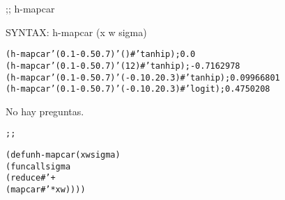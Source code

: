 \begin{aibox}{\function}
;; h-mapcar

SYNTAX: h-mapcar (x w sigma) 
\end{aibox}

\begin{aibox}{\examples}
\begin{alltt}
(h-mapcar '(0.1 -0.5 0.7) '() #'tanhip); 0.0
(h-mapcar '(0.1 -0.5 0.7) '(1 2) #'tanhip); -0.7162978
(h-mapcar '(0.1 -0.5 0.7) '(-0.1 0.2 0.3) #'tanhip); 0.09966801
(h-mapcar '(0.1 -0.5 0.7) '(-0.1 0.2 0.3) #'logit); 0.4750208
\end{alltt}
\end{aibox}

\begin{aibox}{\comments}

\end{aibox}
\begin{aibox}{\answers}
No hay preguntas.
\end{aibox}

\begin{aibox}{\othercomments}

\end{aibox}
\begin{aibox}{\pseudocode}
\end{aibox}
\begin{aibox}{\code}

\begin{alltt}
;;%% code

(defun h-mapcar (x w sigma) 
    (funcall sigma 
        (reduce #'+
            (mapcar #'* x w))))

\end{alltt}
\end{aibox}
